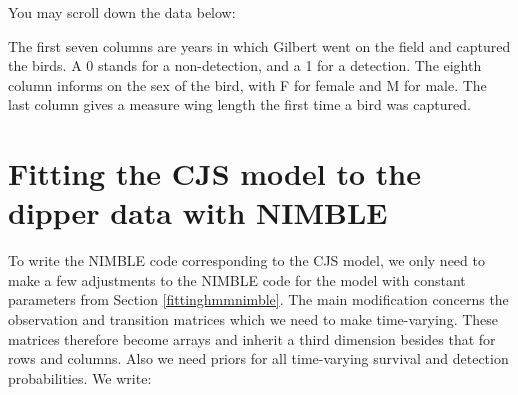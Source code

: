 \documentclass[
  12pt,
]{krantz}
\begin{document}
You may scroll down the data below:

The first seven columns are years in which Gilbert went on the field and captured the birds. A 0 stands for a non-detection, and a 1 for a detection. The eighth column informs on the sex of the bird, with F for female and M for male. The last column gives a measure wing length the first time a bird was captured.

\hypertarget{fitting-the-cjs-model-to-the-dipper-data-with-nimble}{%
\section{Fitting the CJS model to the dipper data with NIMBLE}\label{fitting-the-cjs-model-to-the-dipper-data-with-nimble}}

To write the NIMBLE code corresponding to the CJS model, we only need to make a few adjustments to the NIMBLE code for the model with constant parameters from Section \ref{fittinghmmnimble}. The main modification concerns the observation and transition matrices which we need to make time-varying. These matrices therefore become arrays and inherit a third dimension besides that for rows and columns. Also we need priors for all time-varying survival and detection probabilities. We write:
\end{document}

